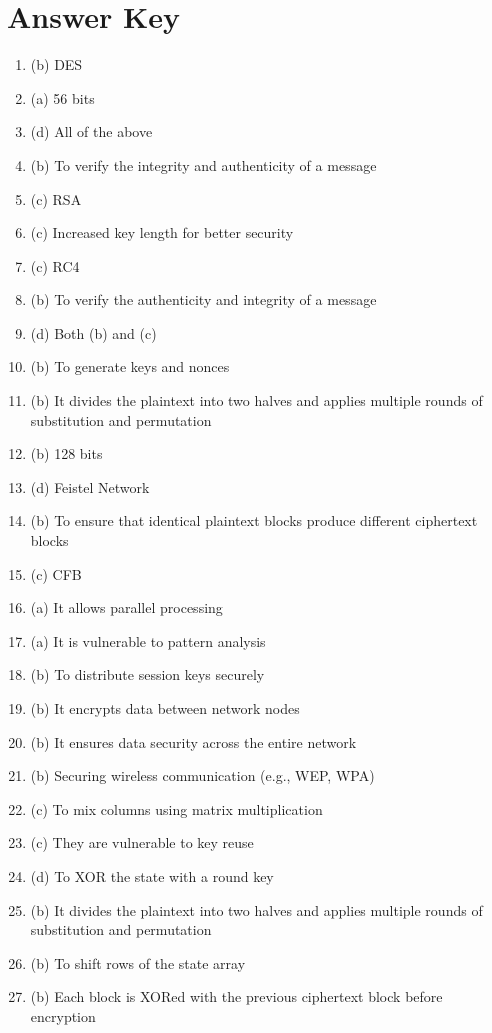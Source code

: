 \documentclass[12pt]{article}
\begin{document}
\section*{Answer Key}
\begin{enumerate}
    \item (b) DES
    \item (a) 56 bits
    \item (d) All of the above
    \item (b) To verify the integrity and authenticity of a message
    \item (c) RSA
    \item (c) Increased key length for better security
    \item (c) RC4
    \item (b) To verify the authenticity and integrity of a message
    \item (d) Both (b) and (c)
    \item (b) To generate keys and nonces
    \item (b) It divides the plaintext into two halves and applies multiple rounds of substitution and permutation
    \item (b) 128 bits
    \item (d) Feistel Network
    \item (b) To ensure that identical plaintext blocks produce different ciphertext blocks
    \item (c) CFB
    \item (a) It allows parallel processing
    \item (a) It is vulnerable to pattern analysis
    \item (b) To distribute session keys securely
    \item (b) It encrypts data between network nodes
    \item (b) It ensures data security across the entire network
    \item (b) Securing wireless communication (e.g., WEP, WPA)
    \item (c) To mix columns using matrix multiplication
    \item (c) They are vulnerable to key reuse
    \item (d) To XOR the state with a round key
    \item (b) It divides the plaintext into two halves and applies multiple rounds of substitution and permutation
    \item (b) To shift rows of the state array
    \item (b) Each block is XORed with the previous ciphertext block before encryption

\end{enumerate}
\end{document}
